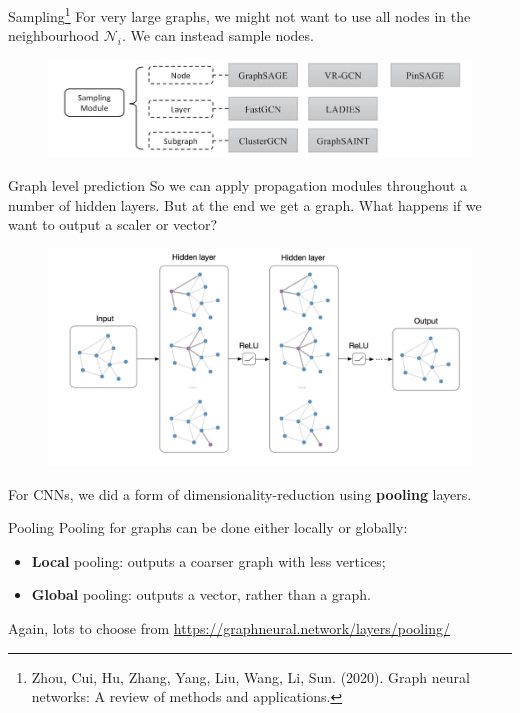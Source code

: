 \documentclass{beamer}
\begin{document}
\begin{frame}{Sampling\footnote{Zhou, Cui, Hu, Zhang, Yang, Liu, Wang, Li, Sun. (2020).
Graph neural networks: A review of methods and applications.}}
For very large graphs, we might not want to use all nodes in the neighbourhood $\mathcal{N}_i$. We can instead sample nodes.
\begin{figure}
\includegraphics[width=0.85\linewidth]{Images/GNN_sampling.jpg}
\end{figure}
\end{frame}
\begin{frame}{Graph level prediction}
So we can apply propagation modules throughout a number of hidden layers. But at the end we get a graph. What happens if we want to output a scaler or vector?
\begin{figure}
\includegraphics[width=0.8\linewidth]{Images/GNN_structure.png}
\end{figure}
For CNNs, we did a form of dimensionality-reduction using \textbf{pooling} layers.
\end{frame}
\begin{frame}{Pooling}
Pooling for graphs can be done either locally or globally:
\begin{itemize}
\item \textbf{Local} pooling: outputs a coarser graph with less vertices;
\item \textbf{Global} pooling: outputs a vector, rather than a graph.
\end{itemize}
Again, lots to choose from \url{https://graphneural.network/layers/pooling/}
\end{frame}
\end{document}
